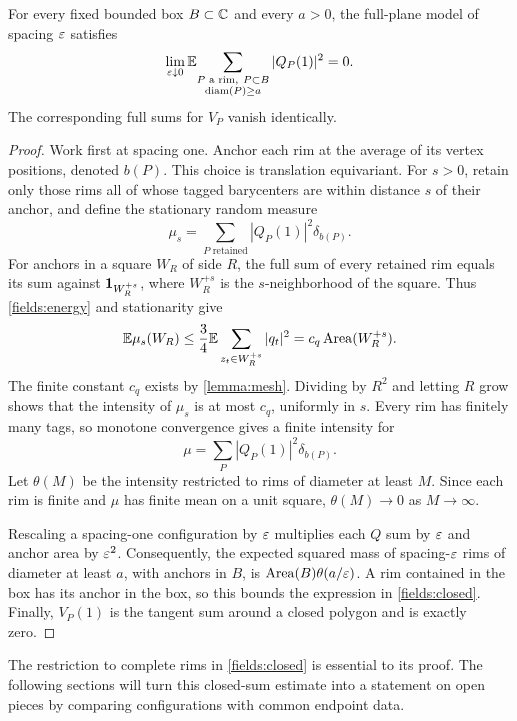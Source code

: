 \begin{proposition}\label{fields:closed-prop}
For every fixed bounded box $B\subset\mathbb C$ and every $a>0$, the full-plane
model of spacing $\varepsilon$ satisfies
\begin{equation}\label{fields:closed}
 \lim_{\varepsilon\downarrow0}
 \mathbb E\!\sum_{\substack{P\text{ a rim},\ P\subset B\\\operatorname{diam}(P)\ge a}}
                   |Q_P(1)|^2=0.
\end{equation}
The corresponding full sums for $V_P$ vanish identically.
\end{proposition}

\begin{proof}
Work first at spacing one.  Anchor each rim at the average of its vertex
positions, denoted $b(P)$.  This choice is translation equivariant.  For
$s>0$, retain only those rims all of whose tagged barycenters are within
distance $s$ of their anchor, and define the stationary random measure
\[
 \mu_s=\sum_{P\text{ retained}}|Q_P(1)|^2\delta_{b(P)}.
\]
For anchors in a square $W_R$ of side $R$, the full sum of every retained
rim equals its sum against $\mathbf 1_{W_R^{+s}}$, where $W_R^{+s}$ is the
$s$-neighborhood of the square.  Thus \eqref{fields:energy} and stationarity
give
\[
 \mathbb E\mu_s(W_R)
 \le \frac34\mathbb E\sum_{z_t\in W_R^{+s}}|q_t|^2
 =c_q\operatorname{Area}(W_R^{+s}).
\]
The finite constant $c_q$ exists by \cref{lemma:mesh}.  Dividing by $R^2$
and letting $R$ grow shows that the intensity of $\mu_s$ is at most $c_q$,
uniformly in $s$.  Every rim has finitely many tags, so monotone convergence
gives a finite intensity for
\[
 \mu=\sum_P|Q_P(1)|^2\delta_{b(P)}.
\]
Let $\theta(M)$ be the intensity restricted to rims of diameter at least
$M$.  Since each rim is finite and $\mu$ has finite mean on a unit square,
$\theta(M)\to0$ as $M\to\infty$.

Rescaling a spacing-one configuration by $\varepsilon$ multiplies each $Q$ sum
by $\varepsilon$ and anchor area by $\varepsilon^2$.  Consequently, the expected squared
mass of spacing-$\varepsilon$ rims of diameter at least $a$, with anchors in $B$,
is $\operatorname{Area}(B)\theta(a/\varepsilon)$.  A rim contained in the box has its anchor in
the box, so this bounds the expression in \eqref{fields:closed}.  Finally,
$V_P(1)$ is the tangent sum around a closed polygon and is exactly zero.
\end{proof}

The restriction to complete rims in \eqref{fields:closed} is essential to
its proof.  The following sections will turn this closed-sum estimate into
a statement on open pieces by comparing configurations with common
endpoint data.
